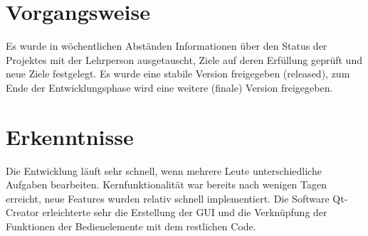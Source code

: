 \documentclass[a4paper,ngerman,headsepline]{scrreprt}
\begin{document}
\section*{Vorgangsweise}
Es wurde in wöchentlichen Abständen Informationen über den Status der Projektes mit der Lehrperson ausgetauscht, Ziele auf deren Erfüllung geprüft und neue Ziele festgelegt. Es wurde eine stabile Version freigegeben (released), zum Ende der Entwicklungsphase wird eine weitere (finale) Version freigegeben.


\section*{Erkenntnisse}
Die Entwicklung läuft sehr schnell, wenn mehrere Leute unterschiedliche Aufgaben bearbeiten.
Kernfunktionalität war bereits nach wenigen Tagen erreicht, neue Features wurden relativ schnell implementiert. Die Software Qt-Creator erleichterte sehr die Erstellung der GUI und die Verknüpfung der Funktionen der Bedienelemente mit dem restlichen Code.



\end{document}

